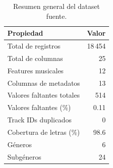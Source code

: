 \begin{table}[htbp]
\centering
\caption{Resumen general del dataset fuente.}
\label{tab:dataset_overview}
\begin{tabular}{lr}
\toprule
Propiedad & Valor \\
\midrule
Total de registros & 18\,454 \\
Total de columnas & 25 \\
Features musicales & 12 \\
Columnas de metadatos & 13 \\
\midrule
Valores faltantes totales & 514 \\
Valores faltantes (\%) & 0.11 \\
Track IDs duplicados & 0 \\
\midrule
Cobertura de letras (\%) & 98.6 \\
Géneros & 6 \\
Subgéneros & 24 \\
\bottomrule
\end{tabular}
\end{table}